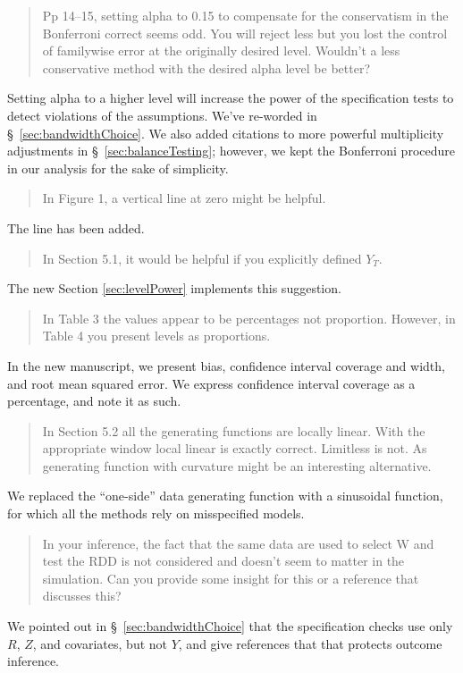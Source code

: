 \documentclass[12pt]{article}
\begin{document}
\begin{quote}
Pp 14--15, setting alpha to 0.15 to compensate for the conservatism in
the Bonferroni correct seems odd. You will reject less but you lost
the control of familywise error at the originally desired
level. Wouldn't a less conservative method with the desired alpha
level be better?
\end{quote}
Setting alpha to a higher level will increase the power of the
specification tests to detect violations of the assumptions. We've
re-worded in \S~\ref{sec:bandwidthChoice}.
We also added citations to more powerful multiplicity adjustments in
\S~\ref{sec:balanceTesting}; however, we kept the Bonferroni procedure
in our analysis for the sake of simplicity.

\begin{quote}
In Figure 1, a vertical line at zero might be helpful.
\end{quote}
The line has been added.

\begin{quote}
In Section 5.1, it would be helpful if you explicitly defined $Y_T$.
\end{quote}
The new Section \ref{sec:levelPower} implements this suggestion.

\begin{quote}
In Table 3 the values appear to be percentages not proportion. However,
in Table 4 you present levels as proportions.
\end{quote}
In the new manuscript, we present bias, confidence interval coverage
and width, and root mean squared error. We express confidence interval
coverage as a percentage, and note it as such.

\begin{quote}
In Section 5.2 all the
generating functions are locally linear. With the appropriate window
local linear is exactly correct. Limitless is not. As generating
function with curvature might be an interesting alternative.
\end{quote}
We replaced the ``one-side'' data generating function with a
sinusoidal function, for which all the methods rely on misspecified
models.

\begin{quote}
In your inference, the fact that the same data are used to select W
and test the RDD is not considered and doesn't seem to matter in the
simulation. Can you provide some insight for this or a reference that
discusses this?
\end{quote}
We pointed out in \S~\ref{sec:bandwidthChoice} that the specification
checks use only $R$, $Z$, and covariates, but not $Y$, and give
references that that protects outcome inference.
\end{document}
